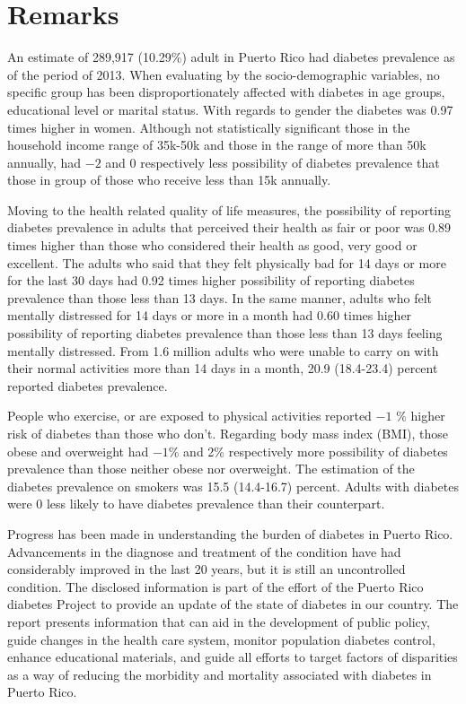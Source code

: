  \section{Remarks}

An estimate of 289,917 
(10.29\%) adult in Puerto Rico had diabetes prevalence as of the period of 2013.
When evaluating by the socio-demographic variables, no specific group has been disproportionately affected with diabetes in age groups, educational level or marital status. With regards to gender the diabetes was 0.97 times higher in women. Although not statistically significant those in the household income range of 35k-50k and those in the range of more than 50k annually, had \ensuremath{-2} and 0 respectively less possibility of diabetes prevalence that those  in group of those who receive less than 15k annually.

Moving to the health related quality of life measures, the possibility of reporting diabetes prevalence in adults that perceived their health as fair or poor was 0.89 times higher than those who considered their health as good, very good or excellent. The adults who said that they felt physically bad for 14 days or more for the last 30 days had 0.92 times higher possibility of reporting diabetes prevalence than those less than 13 days. In the same manner, adults who felt mentally distressed for 14 days or more in a month had 0.60 times higher possibility of reporting diabetes prevalence than those less than 13 days feeling mentally distressed. From 1.6 million adults who were unable to carry on with their normal activities more than 14 days in a month, 20.9 (18.4-23.4) percent reported diabetes prevalence. 

People who exercise, or are exposed to physical activities reported \ensuremath{-1} \% higher risk of diabetes than those who don't.  Regarding body mass index (BMI), those obese and overweight had \ensuremath{-1}\% and 2\% respectively more possibility of diabetes prevalence than those neither obese nor overweight. The estimation of the diabetes prevalence on smokers was 15.5 (14.4-16.7) percent.  Adults with diabetes were 0\5 less likely to have diabetes prevalence than their counterpart.



Progress has been made in understanding the burden of diabetes in Puerto Rico. Advancements in the diagnose and treatment of the condition have had considerably improved in the last 20 years, but it is still an uncontrolled condition. The disclosed information is part of the effort of the Puerto Rico diabetes Project to provide an update of the state of diabetes in our country. The report presents information that can aid in the development of public policy, guide changes in the health care system, monitor population diabetes control, enhance educational materials, and guide all efforts to target factors of disparities as a way of reducing the morbidity and mortality associated with diabetes in Puerto Rico.

